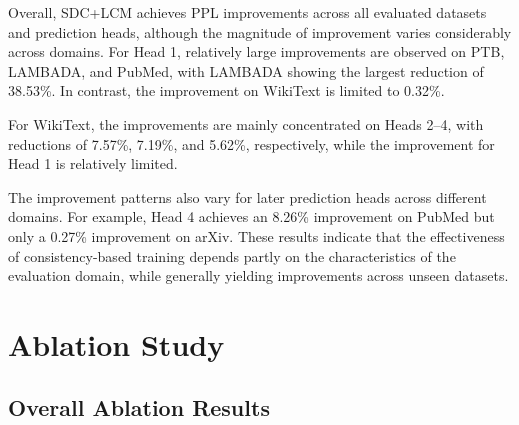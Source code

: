 Overall, SDC+LCM achieves PPL improvements across all evaluated datasets
and prediction heads, although the magnitude of improvement varies
considerably across domains. For Head 1, relatively large improvements
are observed on PTB\cite{marcus1993ptb}, LAMBADA\cite{paperno2016lambada}, and PubMed\cite{cohan2018scientificpapers}, with LAMBADA\cite{paperno2016lambada} showing the
largest reduction of 38.53\%. In contrast, the improvement on WikiText\cite{merity2016wikitext}
is limited to 0.32\%.

For WikiText\cite{merity2016wikitext}, the improvements are mainly concentrated on Heads 2--4,
with reductions of 7.57\%, 7.19\%, and 5.62\%, respectively, while the
improvement for Head 1 is relatively limited.

The improvement patterns also vary for later prediction heads across
different domains. For example, Head 4 achieves an 8.26\% improvement
on PubMed but only a 0.27\% improvement on arXiv. These results indicate
that the effectiveness of consistency-based training depends partly on
the characteristics of the evaluation domain, while generally yielding improvements across unseen datasets.

\section{Ablation Study}\label{sec:ablation_study}

\subsection{Overall Ablation Results}\label{subsec:overall_ablation_results}


